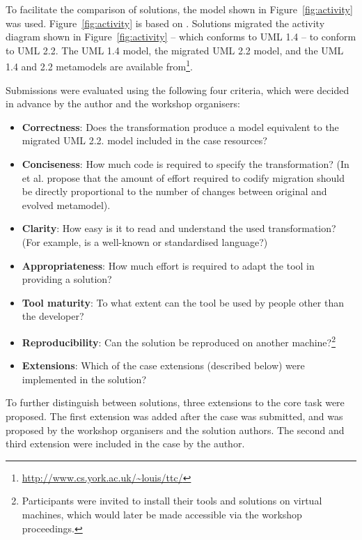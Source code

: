 To facilitate the comparison of solutions, the model shown in Figure~\ref{fig:activity} was used. Figure~\ref{fig:activity} is based on \cite[pg3-165]{uml14}. Solutions migrated the activity diagram shown in Figure~\ref{fig:activity} -- which conforms to UML 1.4 -- to conform to UML 2.2. The UML 1.4 model, the migrated UML 2.2 model, and the UML 1.4 and 2.2 metamodels are available from\footnote{\url{http://www.cs.york.ac.uk/~louis/ttc/}}.

Submissions were evaluated using the following four criteria, which were decided in advance by the author and the workshop organisers:

\begin{itemize}
	\item \textbf{Correctness}: Does the transformation produce a model equivalent to the migrated UML 2.2. model included in the case resources?
	\item \textbf{Conciseness}: How much code is required to specify the transformation? (In \cite{sprinkle04domain} et al. propose that the amount of effort required to codify migration should be directly proportional to the number of changes between original and evolved metamodel).
		\item \textbf{Clarity}: How easy is it to read and understand the used transformation? (For example, is a well-known or standardised language?)
		\item \textbf{Appropriateness}: How much effort is required to adapt the tool in providing a solution?
		\item \textbf{Tool maturity}: To what extent can the tool be used by people other than the developer? 
		\item \textbf{Reproducibility}: Can the solution be reproduced on another machine?\footnote{Participants were invited to install their tools and solutions on virtual machines, which would later be made accessible via the workshop proceedings.}
		\item \textbf{Extensions}: Which of the case extensions (described below) were implemented in the solution?
\end{itemize}

To further distinguish between solutions, three extensions to the core task were proposed. The first extension was added after the case was submitted, and was proposed by the workshop organisers and the solution authors. The second and third extension were included in the case by the author. 

